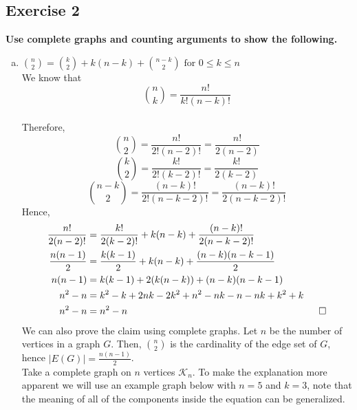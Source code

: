 \subsection*{Exercise 2}
\textbf{Use complete graphs and counting arguments to show the following.}
\begin{enumerate}[a)]
    \item $\binom{n}{2} = \binom{k}{2} + k(n-k) + \binom{n-k}{2} \text{ for } 0 \leq k \leq n $ \\
    \linebreak 
    We know that \begin{equation}\binom{n}{k} = \frac{n!}{k!(n-k)!}\end{equation} \\ 
    Therefore, \\ 
    \linebreak 
    \begin{equation}
        \binom{n}{2} = \frac{n!}{2!(n-2)!} = \frac{n!}{2(n-2)}
    \end{equation}
    \begin{equation}
        \binom{k}{2} = \frac{k!}{2!(k-2)!} = \frac{k!}{2(k-2)}
    \end{equation}
    \begin{equation}
        \binom{n-k}{2} = \frac{(n-k)!}{2!(n-k-2)!} = \frac{(n-k)!}{2(n-k-2)!}
    \end{equation}
    Hence, 
    \begin{align}
    \notag
        \frac{n!}{2(n-2)!} &= \frac{k!}{2(k-2)!} + k(n-k) + \frac{(n-k)!}{2(n-k-2)!} \\
        \notag
        \frac{n(n-1)}{2} &= \frac{k(k-1)}{2} + k(n-k) + \frac{(n-k)(n-k-1)}{2} \\
        \notag
        n(n-1) &= k(k-1) + 2(k(n-k)) + (n-k)(n-k-1) \\
        \notag
        n^2 - n &= k^2 - k + 2nk - 2k^2 + n^2 - nk - n - nk + k^2 + k \\
        n^2 - n &= n^2 - n \hspace{7cm} \square
    \end{align}
    We can also prove the claim using complete graphs. Let $n$ be the number of vertices in a graph $G$. Then, $\binom{n}{2}$ is the cardinality of the edge set of $G$, hence $|E(G)| = \frac{n(n-1)}{2}$. \\
    \linebreak 
    Take a complete graph on $n$ vertices $\mathcal{K}_n$. To make the explanation more apparent we will use an example graph below with $n = 5$ and $k = 3$, note that the meaning of all of the components inside the equation can be generalized.

\end{enumerate}
